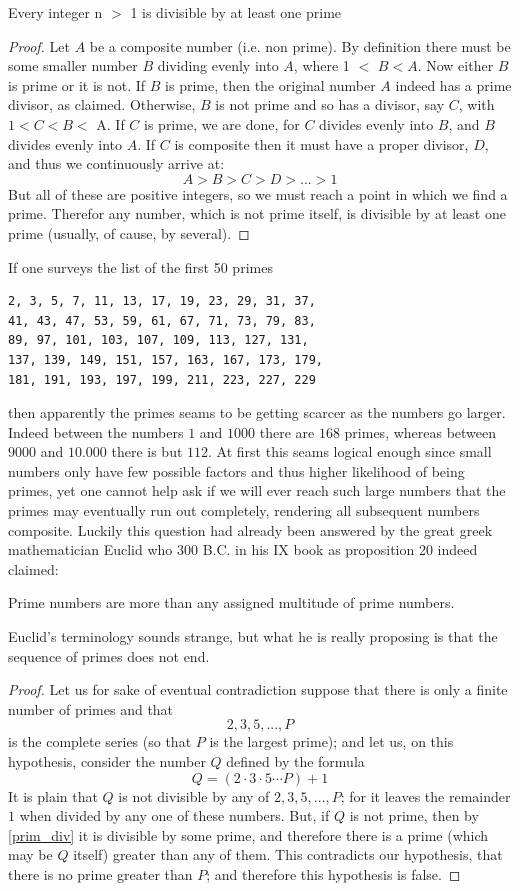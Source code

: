 \begin{proposition}\label{prim_div}
Every integer n $>$ 1 is divisible by at least one prime
\end{proposition}
\begin{proof}
Let $A$ be a composite number (i.e. non prime). By definition there must be some smaller number $B$ dividing evenly into $A$, where 1 $<$ $B < A$. Now either $B$ is prime or it is not. If $B$ is prime, then the original number $A$ indeed has a prime divisor, as claimed. Otherwise, $B$ is not prime and so has a divisor, say $C$, with $1 < C < B <$ A. If $C$ is prime, we are done, for $C$ divides evenly into $B$, and $B$ divides evenly into $A$. If $C$ is composite then it must have a proper divisor, $D$, and thus we continuously arrive at:
\[
A > B > C > D > ... > 1
\]
But all of these are positive integers, so we must reach a point in which we find a prime. Therefor any number, which is not prime itself, is divisible by at least one prime (usually, of cause, by several).
\end{proof}

If one surveys the list of the first 50 primes
\begin{lstlisting}
2, 3, 5, 7, 11, 13, 17, 19, 23, 29, 31, 37,
41, 43, 47, 53, 59, 61, 67, 71, 73, 79, 83,
89, 97, 101, 103, 107, 109, 113, 127, 131,
137, 139, 149, 151, 157, 163, 167, 173, 179,
181, 191, 193, 197, 199, 211, 223, 227, 229
\end{lstlisting}
then apparently the primes seams to be getting scarcer as the numbers go larger. Indeed between the numbers $1$ and $1000$ there are $168$ primes, whereas between $9000$ and $10.000$ there is but $112$. At first this seams logical enough since small numbers only have few possible factors and thus higher likelihood of being primes, yet one cannot help ask if we will ever reach such large numbers that the primes may eventually run out completely, rendering all subsequent numbers composite. Luckily this question had already been answered by the great greek mathematician Euclid who 300 B.C. in his IX book as proposition 20 indeed claimed:

\begin{proposition}
Prime numbers are more than any assigned multitude of prime numbers.
\end{proposition}
Euclid's terminology sounds strange, but what he is really proposing is that the sequence of primes does not end.
\begin{proof}
Let us for sake of eventual contradiction suppose that there is only a finite number of primes and that
\[
2, 3, 5, ..., P
\]
is the complete series (so that $P$ is the largest prime); and let us, on this hypothesis, consider the number $Q$ defined by the formula
\[
Q = (2 \cdot 3 \cdot 5 \cdots P) + 1
\]
It is plain that $Q$ is not divisible by any of $2, 3, 5, ..., P$; for it leaves the remainder $1$ when divided by any one of these numbers. But, if $Q$ is not prime, then by \ref{prim_div} it is divisible by some prime, and therefore there is a prime (which may be $Q$ itself) greater than any of them. This contradicts our hypothesis, that there is no prime greater than $P$; and therefore this hypothesis is false.
\end{proof}


